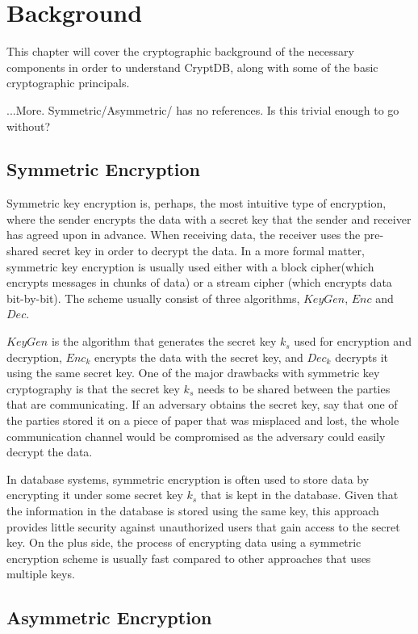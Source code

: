 \chapter{Background}
\label{chp:background}

This chapter will cover the cryptographic background of the necessary components in order to understand CryptDB, along with some of the basic cryptographic principals.

...More. Symmetric/Asymmetric/ has no references. Is this trivial enough to go without?

\section{Symmetric Encryption}

Symmetric key encryption is, perhaps, the most intuitive type of encryption, where the sender encrypts the data with a secret key that the sender and receiver has agreed upon in advance. When receiving data, the receiver uses the pre-shared secret key in order to decrypt the data. In a more formal matter, symmetric key encryption is usually used either with a block cipher(which encrypts messages in chunks of data) or a stream cipher (which encrypts data bit-by-bit). The scheme usually consist of three algorithms, $KeyGen$, $Enc$ and $Dec$.

$KeyGen$ is the algorithm that generates the secret key $k_s$ used for encryption and decryption, $Enc_k$ encrypts the data with the secret key, and $Dec_k$ decrypts it using the same secret key. One of the major drawbacks with symmetric key cryptography is that the secret key $k_s$ needs to be shared between the parties that are communicating. If an adversary obtains the secret key, say that one of the parties stored it on a piece of paper that was misplaced and lost, the whole communication channel would be compromised as the adversary could easily decrypt the data.

In database systems, symmetric encryption is often used to store data by encrypting it under some secret key $k_s$ that is kept in the database. Given that the information in the database is stored using the same key, this approach provides little security against unauthorized users that gain access to the secret key. On the plus side, the process of encrypting data using a symmetric encryption scheme is usually fast compared to other approaches that uses multiple keys.


\section{Asymmetric Encryption}

